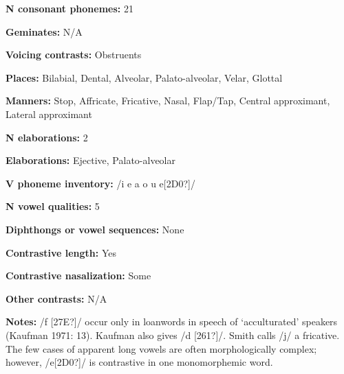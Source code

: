 \begin{styleBody}
\textbf{N consonant phonemes:} 21
\end{styleBody}

\begin{styleBody}
\textbf{Geminates:} N/A
\end{styleBody}

\begin{styleBody}
\textbf{Voicing contrasts:} Obstruents
\end{styleBody}

\begin{styleBody}
\textbf{Places:} Bilabial, Dental, Alveolar, Palato-alveolar, Velar, Glottal
\end{styleBody}

\begin{styleBody}
\textbf{Manners:} Stop, Affricate, Fricative, Nasal, Flap/Tap, Central approximant, Lateral approximant
\end{styleBody}

\begin{styleBody}
\textbf{N elaborations:} 2
\end{styleBody}

\begin{styleBody}
\textbf{Elaborations:} Ejective, Palato-alveolar
\end{styleBody}

\begin{styleBody}
\textbf{V phoneme inventory:} /i e a o u e[2D0?]/
\end{styleBody}

\begin{styleBody}
\textbf{N vowel qualities: }5
\end{styleBody}

\begin{styleBody}
\textbf{Diphthongs or vowel sequences:} None
\end{styleBody}

\begin{styleBody}
\textbf{Contrastive length:} Yes
\end{styleBody}

\begin{styleBody}
\textbf{Contrastive nasalization:} Some
\end{styleBody}

\begin{styleBody}
\textbf{Other contrasts:} N/A
\end{styleBody}

\begin{styleBody}
\textbf{Notes:} /f [27E?]/ occur only in loanwords in speech of ‘acculturated’ speakers (Kaufman 1971: 13). Kaufman also gives /d [261?]/. Smith calls /j/ a fricative. The few cases of apparent long vowels are often morphologically complex; however, /e[2D0?]/ is contrastive in one monomorphemic word.
\end{styleBody}

